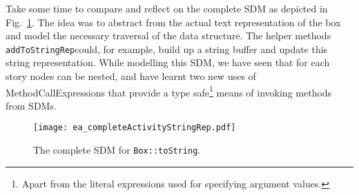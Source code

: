
Take some time to compare and reflect on the complete SDM as depicted in Fig.~\ref{fig:sdm_tostring_5}.  The idea was to abstract from the actual text
representation of the box and model the necessary traversal of the data structure. The helper methods \texttt{addToStringRep}could, for example, build up a
string buffer and update this string representation. While modelling this SDM, we have seen that for each story nodes can be nested, and have learnt two new
uses of MethodCallExpressions that provide a type safe\footnote{Apart from the literal expressions used for specifying argument values.} means of invoking
methods from SDMs.

\begin{figure}[htbp]
\begin{center}
  \texttt{[image: ea\_completeActivityStringRep.pdf]}
  \caption{The complete SDM for \texttt{Box::toString}.}  
  \label{fig:sdm_tostring_5}
\end{center}
\end{figure}
\FloatBarrier